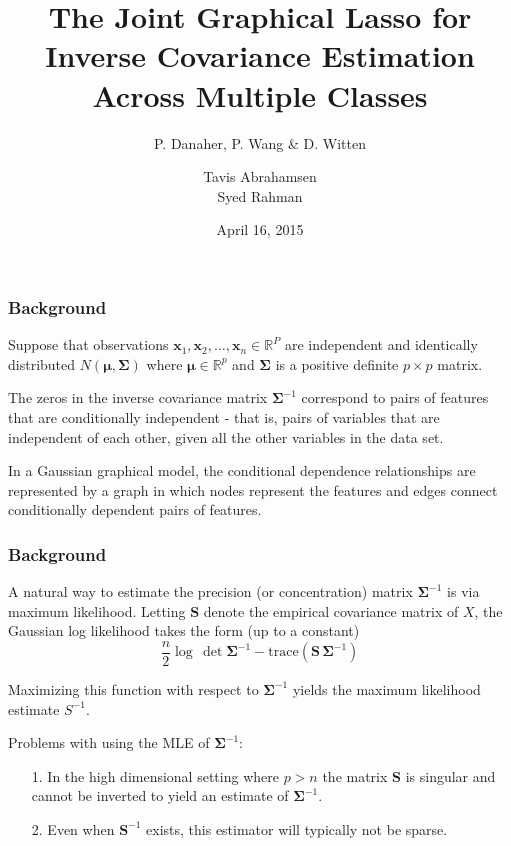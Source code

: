 \documentclass[t]{beamer}
\title[The Joint Graphical Lasso]{The Joint Graphical Lasso for \\Inverse Covariance Estimation Across Multiple Classes}
\subtitle{P. Danaher, P. Wang \& D. Witten}
\author[Abrahamsen \& Rahman]{Tavis Abrahamsen \\ Syed Rahman}
\institute[ ]{Department of Statistics \\ University of Florida}
\date{April 16, 2015}
\begin{document}
\begin{frame}
 \titlepage
\end{frame}

\begin{frame}
\frametitle{Background}
Suppose that observations $\bm{x}_{1},\bm{x}_{2},\ldots,\bm{x}_{n} \in \mathbb{R}^{P}$ are independent and identically distributed $N(\bm{\mu},\bm{\Sigma})$ where $\bm{\mu} \in \mathbb{R}^{p}$ and $\bm{\Sigma}$ is a positive definite $p\times p$ matrix. 

\bigskip
\pause
The zeros in the inverse covariance matrix $\bm{\Sigma}^{-1}$ correspond to pairs of features that are conditionally independent - that is, pairs of variables that are independent of each other, given all the other variables in the data set.

\bigskip
\pause
In a Gaussian graphical model, the conditional dependence relationships are represented by a graph in which nodes represent the features and edges connect conditionally dependent pairs of features.
\end{frame}

\begin{frame}
\frametitle{Background}
A natural way to estimate the precision (or concentration) matrix $\bm{\Sigma}^{-1}$ is via maximum likelihood.  Letting $\bm{S}$ denote the empirical covariance matrix of $X$, the Gaussian log likelihood takes the form (up to a constant)
\small
\begin{equation*}
\frac{n}{2}\log\, \det \bm{\Sigma}^{-1} - \mbox{trace}\left(\bm{S\,\Sigma}^{-1}\right)
\end{equation*}

\normalsize
\bigskip
\pause
Maximizing this function with respect to $\bm{\Sigma}^{-1}$ yields the maximum likelihood estimate $S^{-1}$.

\bigskip
\pause
Problems with using the MLE of $\bm{\Sigma}^{-1}$:
\begin{itemize}
	\item[1.] In the high dimensional setting where $p > n$ the matrix $\bm{S}$ is singular and cannot be inverted to yield an estimate of $\bm{\Sigma}^{-1}$.
	
	\bigskip
	\item[2.] Even when $\bm{S}^{-1}$ exists, this estimator will typically not be sparse.
\end{itemize}
\end{frame}
\end{document}
